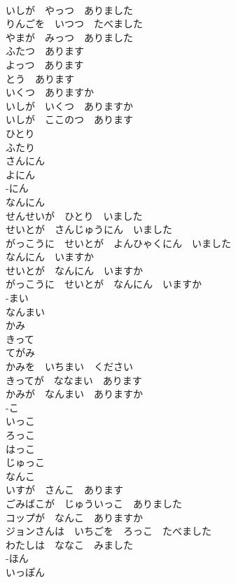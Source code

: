 \documentclass[8pt]{extreport}
\begin{document}
\begin{CJK}{UTF8}{min}
\\	いしが　やっつ　ありました	
\\	りんごを　いつつ　たべました	
\\	やまが　みっつ　ありました	
\\	ふたつ　あります	
\\	よっつ　あります	
\\	とう　あります	
\\	いくつ　ありますか	
\\	いしが　いくつ　ありますか	
\\	いしが　ここのつ　あります	
\\	ひとり	
\\	ふたり	
\\	さんにん	
\\	よにん	
\\	-にん	
\\	なんにん	
\\	せんせいが　ひとり　いました	
\\	せいとが　さんじゅうにん　いました	
\\	がっこうに　せいとが　よんひゃくにん　いました	
\\	なんにん　いますか	
\\	せいとが　なんにん　いますか	
\\	がっこうに　せいとが　なんにん　いますか	
\\	-まい	
\\	なんまい	
\\	かみ	
\\	きって	
\\	てがみ	
\\	かみを　いちまい　ください	
\\	きってが　ななまい　あります	
\\	かみが　なんまい　ありますか	
\\	-こ	
\\	いっこ	
\\	ろっこ	
\\	はっこ	
\\	じゅっこ	
\\	なんこ	
\\	いすが　さんこ　あります	
\\	ごみばこが　じゅういっこ　ありました	
\\	コップが　なんこ　ありますか	
\\	ジョンさんは　いちごを　ろっこ　たべました	
\\	わたしは　ななこ　みました	
\\	-ほん	
\\	いっぽん	

\end{CJK}
\end{document}
